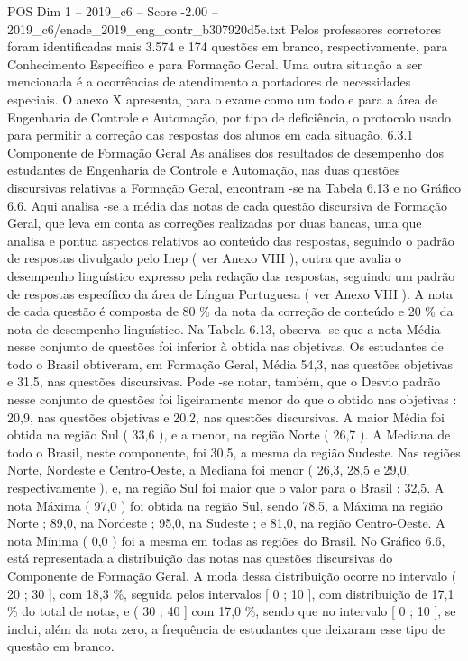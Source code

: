\begin{textsample}{POS Dim 1 – 2019\_c6 – Score -2.00 – 2019\_c6/enade\_2019\_eng\_contr\_b307920d5e.txt}
Pelos professores corretores foram identificadas mais 3.574 e 174 questões em branco, respectivamente, para Conhecimento Específico e para Formação Geral.
Uma outra situação a ser mencionada é a ocorrências de atendimento a portadores de necessidades especiais.
O anexo X apresenta, para o exame como um todo e para a área de Engenharia de Controle e Automação, por tipo de deficiência, o protocolo usado para permitir a correção das respostas dos alunos em cada situação. 6.3.1 Componente de Formação Geral As análises dos resultados de desempenho dos estudantes de Engenharia de Controle e Automação, nas duas questões discursivas relativas a Formação Geral, encontram -se na Tabela 6.13 e no Gráfico 6.6.
Aqui analisa -se a média das notas de cada questão discursiva de Formação Geral, que leva em conta as correções realizadas por duas bancas, uma que analisa e pontua aspectos relativos ao conteúdo das respostas, seguindo o padrão de respostas divulgado pelo Inep ( ver Anexo VIII ), outra que avalia o desempenho linguístico expresso pela redação das respostas, seguindo um padrão de respostas específico da área de Língua Portuguesa ( ver Anexo VIII ).
A nota de cada questão é composta de 80 \% da nota da correção de conteúdo e 20 \% da nota de desempenho linguístico.
Na Tabela 6.13, observa -se que a nota Média nesse conjunto de questões foi inferior à obtida nas objetivas.
Os estudantes de todo o Brasil obtiveram, em Formação Geral, Média 54,3, nas questões objetivas e 31,5, nas questões discursivas.
Pode -se notar, também, que o Desvio padrão nesse conjunto de questões foi ligeiramente menor do que o obtido nas objetivas : 20,9, nas questões objetivas e 20,2, nas questões discursivas.
A maior Média foi obtida na região Sul ( 33,6 ), e a menor, na região Norte ( 26,7 ).
A Mediana de todo o Brasil, neste componente, foi 30,5, a mesma da região Sudeste.
Nas regiões Norte, Nordeste e Centro-Oeste, a Mediana foi menor ( 26,3, 28,5 e 29,0, respectivamente ), e, na região Sul foi maior que o valor para o Brasil : 32,5.
A nota Máxima ( 97,0 ) foi obtida na região Sul, sendo 78,5, a Máxima na região Norte ; 89,0, na Nordeste ; 95,0, na Sudeste ; e 81,0, na região Centro-Oeste.
A nota Mínima ( 0,0 ) foi a mesma em todas as regiões do Brasil.
No Gráfico 6.6, está representada a distribuição das notas nas questões discursivas do Componente de Formação Geral.
A moda dessa distribuição ocorre no intervalo ( 20 ; 30 ], com 18,3 \%, seguida pelos intervalos [ 0 ; 10 ], com distribuição de 17,1 \% do total de notas, e ( 30 ; 40 ] com 17,0 \%, sendo que no intervalo [ 0 ; 10 ], se inclui, além da nota zero, a frequência de estudantes que deixaram esse tipo de questão em branco.

\end{textsample}
